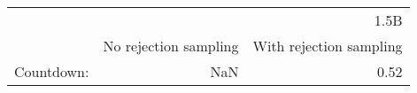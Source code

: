 \begin{tabular}{lrr}
\toprule
 & \multicolumn{2}{r}{1.5B} \\
 & No rejection 
sampling & With rejection 
sampling \\
\midrule
Countdown: & NaN & 0.52 \\
\bottomrule
\end{tabular}
